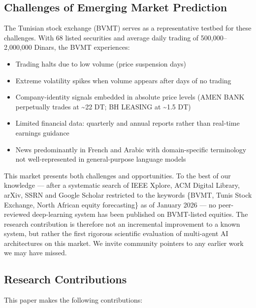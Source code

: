 \documentclass[conference]{IEEEtran}
\begin{document}
\subsection{Challenges of Emerging Market Prediction}

The Tunisian stock exchange (BVMT) serves as a representative testbed for these challenges. With 68 listed securities and average daily trading of 500,000--2,000,000 Dinars, the BVMT experiences:
\begin{itemize}
\item Trading halts due to low volume (price suspension days)
\item Extreme volatility spikes when volume appears after days of no trading
\item Company-identity signals embedded in absolute price levels (AMEN BANK perpetually trades at \~{}22 DT; BH LEASING at \~{}1.5 DT)
\item Limited financial data: quarterly and annual reports rather than real-time earnings guidance
\item News predominantly in French and Arabic with domain-specific terminology not well-represented in general-purpose language models
\end{itemize}

This market presents both challenges and opportunities. To the best of our knowledge --- after a systematic search of IEEE Xplore, ACM Digital Library, arXiv, SSRN and Google Scholar restricted to the keywords \{BVMT, Tunis Stock Exchange, North African equity forecasting\} as of January 2026 --- no peer-reviewed deep-learning system has been published on BVMT-listed equities. The research contribution is therefore not an incremental improvement to a known system, but rather the first rigorous scientific evaluation of multi-agent AI architectures on this market. We invite community pointers to any earlier work we may have missed.

\subsection{Research Contributions}

This paper makes the following contributions:
\end{document}
